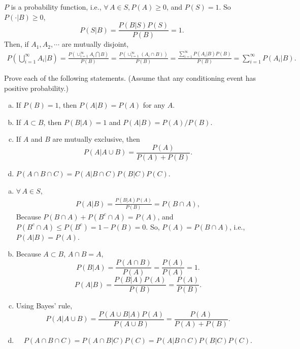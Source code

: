 \documentclass[14pt]{elegantbook}
\begin{document}
    \begin{solution}
        $P$ is a probability function, i.e., $\forall\,A\in S, P(A)\geq 0$, and $P(S)=1$. So $P(\cdot|B)\geq0$,
        \[
            P(S|B)=\frac{P(B|S)P(S)}{P(B)}=1. 
        \]
        Then, if $A_1, A_2, \cdots$ are mutually disjoint, 
        \begin{align*}
            P\left(\bigcup_{i=1}^\infty A_i\big|B\right)=\frac{P\left(\cup_{i=1}^\infty A_i \bigcap B\right)}{P(B)}=\frac{P(\cup_{i=1}^\infty(A_i\cap B))}{P(B)}=\frac{\sum_{i=1}^\infty P(A_i|B)P(B)}{P(B)}=\sum_{i=1}^\infty P(A_i|B). 
        \end{align*}
    \end{solution}

    \setcounter{exer}{37}
    \begin{exercise}
        Prove each of the following statements. (Assume that any conditioning event has positive probability.)
        \begin{enumerate}[(a)]
            \item If $P(B)=1$, then $P(A|B)=P(A)$ for any $A$. 
            \item If $A\subset B$, then $P(B|A)=1$ and $P(A|B)=P(A)/P(B)$. 
            \item If $A$ and $B$ are mutually exclusive, then \[
                P(A|A\cup B)=\frac{P(A)}{P(A)+P(B)}. 
            \]
            \item $P(A\cap B\cap C)=P(A|B\cap C)P(B|C)P(C)$. 
        \end{enumerate}
    \end{exercise}

    \begin{solution}
        \begin{enumerate}[(a)]
            \item $\forall\,A\in S$, \begin{align*}
                P(A|B)=\frac{P(B|A)P(A)}{P(B)}=P(B\cap A), 
            \end{align*}
            Because $P(B\cap A)+P(B^c\cap A)=P(A)$, and $P(B^c\cap A)\leq P(B^c)=1-P(B)=0$. So, $P(A)=P(B\cap A)$, i.e., $P(A|B)=P(A)$. 
            \item Because $A\subset B$, $A\cap B=A$, 
            \[
                P(B|A)=\frac{P(A\cap B)}{P(A)}=\frac{P(A)}{P(A)}=1. 
            \]
            \[
                P(A|B)=\frac{P(B|A)P(A)}{P(B)}=\frac{P(A)}{P(B)}. 
            \]
            \item Using Bayes' rule,
            \[
                P(A|A\cup B)=\frac{P(A\cup B|A)P(A)}{P(A\cup B)}=\frac{P(A)}{P(A)+P(B)}. 
            \]
            \item \[
                P(A\cap B\cap C)=P(A\cap B|C)P(C)=P(A|B\cap C)P(B|C)P(C). 
            \]
        \end{enumerate}
    \end{solution}
\end{document}
